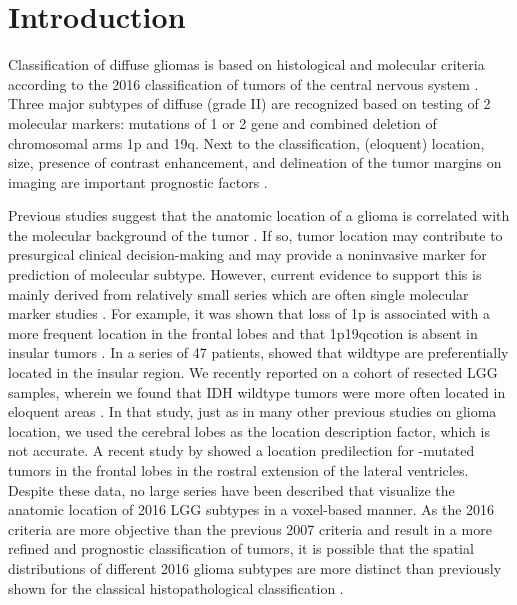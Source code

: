 \section{Introduction}
Classification of diffuse gliomas is based on histological and molecular criteria according to the 2016  classification of \glspl{tumor} of the central nervous system \autocite{louis2014international}.
Three major subtypes of diffuse  (grade II)  are recognized based on testing of 2 molecular markers: mutations of  1 or 2 gene and combined deletion of chromosomal arms 1p and 19q.
Next to the  classification, (eloquent) location, size, presence of contrast enhancement, and delineation of the \gls{tumor} margins on  imaging are important prognostic factors \autocite{pignatti2002prognostic, jakola2012low, capelle2013spontaneous, chang2008preoperative}.

Previous studies suggest that the anatomic location of a glioma is correlated with the molecular background of the \gls{tumor} \autocite{stockhammer2012idh1, goze2009lack, laigle2004correlations, metellus2010absence}.
If so, \gls{tumor} location may contribute to presurgical clinical decision-making and may provide a noninvasive marker for prediction of molecular subtype.
However, current evidence to support this is mainly derived from relatively small series which are often single molecular marker studies  \autocite{stockhammer2012idh1, goze2009lack, laigle2004correlations, metellus2010absence}.
For example, it was shown that loss of 1p is associated with a more frequent location in the frontal lobes and that \acl{1p19qcotion} is absent in insular \glspl{tumor} \autocite{goze2009lack, laigle2004correlations}.
In a series of 47 patients,  showed that  wildtype  are preferentially located in the insular region.
We recently reported on a cohort of resected LGG samples, wherein we found that IDH wildtype \glspl{tumor} were more often located in eloquent areas \autocite{wijnenga2017impact}.
In that study, just as in many other previous studies on glioma location, we used the cerebral lobes as the location description factor, which is not accurate.
A recent study by  showed a location predilection for -mutated \glspl{tumor} in the frontal lobes in the rostral extension of the lateral ventricles.
Despite these data, no large series have been described that visualize the anatomic location of  2016 LGG subtypes in a voxel-based manner.
As the  2016 criteria are more objective than the previous  2007 criteria and result in a more refined and prognostic classification of \glspl{tumor}, it is possible that the spatial distributions of different  2016 glioma subtypes are more distinct than previously shown for the classical histopathological classification \autocite{larjavaara2007incidence}.

